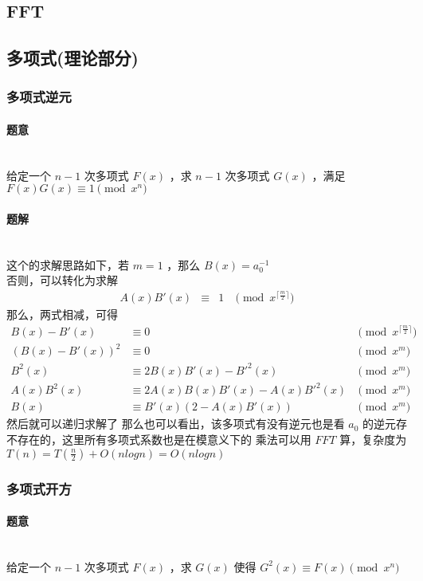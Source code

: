 	\subsection{FFT}
	
	\newpage
	\subsection{多项式(理论部分)}
	\subsubsection{多项式逆元}
	\paragraph{题意}~\\给定一个 $n-1$ 次多项式 $F(x)$ ，求 $n-1$ 次多项式 $G(x)$ ，满足 $F(x)G(x)\equiv 1\pmod{x^n}$
	\paragraph{题解}~\\
	这个的求解思路如下，若 $m=1$ ，那么 $B(x)=a_0^{-1}$\\
	否则，可以转化为求解
	$$
	\begin{aligned}
	A(x)B'(x)&\equiv&1&\pmod{x^{\lceil\frac{m}{2} \rceil }}
	\end{aligned}
	$$
	那么，两式相减，可得
	$$
	\begin{aligned}
	B(x)-B'(x)&\equiv0&\pmod{x^{\lceil\frac{m}{2} \rceil}}\\
	(B(x)-B'(x))^2&\equiv0&\pmod{x^m}\\
	B^2(x)&\equiv2B(x)B'(x)-{B'}^2(x)&\pmod{x^m}\\
	A(x)B^2(x)&\equiv2A(x)B(x)B'(x)-A(x){B'}^2(x)&\pmod{x^m}\\
	B(x)&\equiv B'(x)(2-A(x)B'(x))&\pmod{x^m}
	\end{aligned}
	$$
	然后就可以递归求解了
	那么也可以看出，该多项式有没有逆元也是看 $a_0$ 的逆元存不存在的，这里所有多项式系数也是在模意义下的
	乘法可以用 $FFT$ 算，复杂度为 $T(n)=T(\frac{n}{2})+O(nlogn)=O(nlogn)$\\
	\vspace{1cm}
	\subsubsection{多项式开方}
	\paragraph{题意}~\\
	给定一个 $n-1$ 次多项式 $F(x)$ ，求 $G(x)$ 使得 $G^2(x)\equiv F(x)\pmod {x^n}$
